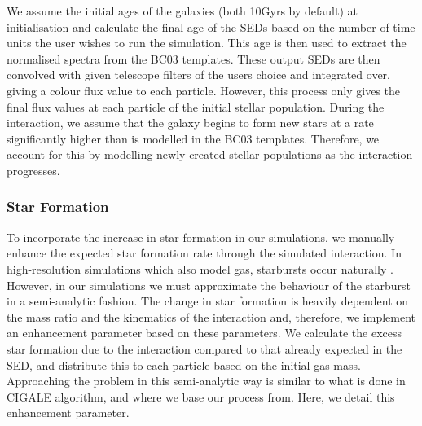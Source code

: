 We assume the initial ages of the galaxies (both 10Gyrs by default) at initialisation and calculate the final age of the SEDs based on the number of time units the user wishes to run the simulation. This age is then used to extract the normalised spectra from the BC03 templates. These output SEDs are then convolved with given telescope filters of the users choice and integrated over, giving a colour flux value to each particle. However, this process only gives the final flux values at each particle of the initial stellar population. During the interaction, we assume that the galaxy begins to form new stars at a rate significantly higher than is modelled in the BC03 templates. Therefore, we account for this by modelling newly created stellar populations as the interaction progresses.

\subsubsection{Star Formation}\label{SFR_in_Model}
To incorporate the increase in star formation in our simulations, we manually enhance the expected star formation rate through the simulated interaction. In 
high-resolution simulations which also model gas, starbursts occur naturally \citep{2009PASJ...61..481S}. However, in our simulations we must approximate the behaviour of the starburst in a semi-analytic fashion. The change in star formation is heavily dependent on the mass ratio and the kinematics of the interaction and, therefore, we implement an enhancement parameter based on these parameters. We calculate the excess star formation due to the interaction compared to that already expected in the SED, and distribute this to each particle based on the initial gas mass. Approaching the problem in this semi-analytic way is similar to what is done in CIGALE \citep{Boquien_18} algorithm, and where we base our process from. Here, we detail this enhancement parameter.

